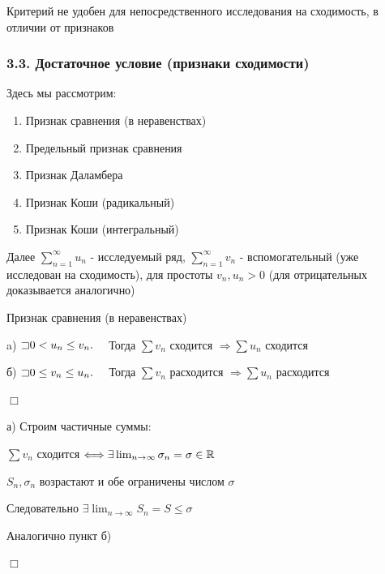 \documentclass[12pt]{article}
\begin{document}
    \Notas Критерий не удобен для непосредственного исследования на сходимость, в отличии от признаков


    \subsubsection{3.3. Достаточное условие (признаки сходимости)}

    Здесь мы рассмотрим:

    \begin{enumerate}
        \item Признак сравнения (в неравенствах)
        \item Предельный признак сравнения
        \item Признак Даламбера
        \item Признак Коши (радикальный)
        \item Признак Коши (интегральный)
    \end{enumerate}

    Далее $\sum_{n = 1}^\infty u_n$ - исследуемый ряд, $\sum_{n = 1}^\infty v_n$ - вспомогательный (уже исследован на сходимость),
    для простоты $v_n, u_n > 0$ (для отрицательных доказывается аналогично)

    \mediumvspace

    \begin{MyTheorem}
         Признак сравнения (в неравенствах)

        a) $\mathord{\sqsupset} 0 < u_n \leq v_n. \quad$ Тогда $\sum v_n$ сходится $\Longrightarrow \sum u_n$ сходится

        б) $\mathord{\sqsupset} 0 \leq v_n \leq u_n. \quad$ Тогда $\sum v_n$ расходится $\Longrightarrow \sum u_n$ расходится
    \end{MyTheorem}

    \begin{MyProof}
        $\Box$

        а) Строим частичные суммы:

        $\sum v_n$ сходится $\Longleftrightarrow \exists \lim_{n \to \infty} \sigma_n = \sigma \in \mathbb{R}$

        $S_n, \sigma_n$ возрастают и обе ограничены числом $\sigma$

        Следовательно $\exists \lim_{n \to \infty} S_n = S \leq \sigma$

        Аналогично пункт б)

        $\Box$
    \end{MyProof}
\end{document}
